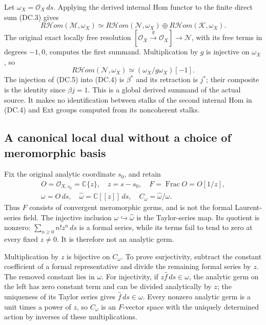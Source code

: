 Let $\omega_X=\mathcal O_X\,ds$.  Applying the derived internal Hom
functor to the finite direct sum (DC.3) gives
\[
 R\mathcal H om(\mathcal M,\omega_X)
 \simeq R\mathcal H om(\mathcal N,\omega_X)
       \oplus R\mathcal H om(\mathcal K,\omega_X).
 \tag{DC.4}
\]
The original exact locally free resolution
$[\mathcal O_X\xrightarrow{g}\mathcal O_X]\to\mathcal N$,
with its free terms in degrees $-1,0$, computes the first summand.
Multiplication by $g$ is injective on $\omega_X$, so
\[
 R\mathcal H om(\mathcal N,\omega_X)
       \simeq(\omega_X/g\omega_X)[-1].
 \tag{DC.5}
\]
The injection of (DC.5) into (DC.4) is $\beta^*$ and its retraction
is $j^*$; their composite is the identity since $\beta j=1$.
This is a global derived summand of the actual source.  It makes no
identification between stalks of the second internal Hom in (DC.4)
and Ext groups computed from its noncoherent stalks.

\subsection{A canonical local dual without a choice of meromorphic basis}

Fix the original analytic coordinate $s_0$, and retain
\[
 \begin{gathered}
 O=\mathcal O_{X,s_0}=\mathbb C\{z\},\quad z=s-s_0,\quad
 F=\operatorname{Frac}O=O[1/z],\\
 \omega=O\,ds,\quad\widehat\omega=\mathbb C[[z]]\,ds,
 \quad C_\omega=\widehat\omega/\omega.
 \end{gathered}
 \tag{DC.6}
\]
Thus $F$ consists of convergent meromorphic germs, and is not the
formal Laurent-series field.  The injective inclusion
$\omega\hookrightarrow\widehat\omega$ is the Taylor-series map.
Its quotient is nonzero: $\sum_{n\ge0}n!z^n\,ds$ is a formal
series, while its terms fail to tend to zero at every fixed $z\ne0$.
It is therefore not an analytic germ.

Multiplication by $z$ is bijective on $C_\omega$.  To prove
surjectivity, subtract the constant coefficient of a formal
representative and divide the remaining formal series by $z$.
The removed constant lies in $\omega$.  For injectivity, if
$z\widehat f\,ds\in\omega$, the analytic germ on the left has
zero constant term and can be divided analytically by $z$;
the uniqueness of its Taylor series gives $\widehat f\,ds\in\omega$.
Every nonzero analytic germ is a unit times a power of $z$, so
$C_\omega$ is an $F$-vector space with the uniquely determined
action by inverses of these multiplications.

